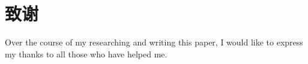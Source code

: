 	\chapter*{致\hspace{0.8cm}谢}
	Over the course of my researching and writing this paper, I would like to express my thanks to all those who have helped me.